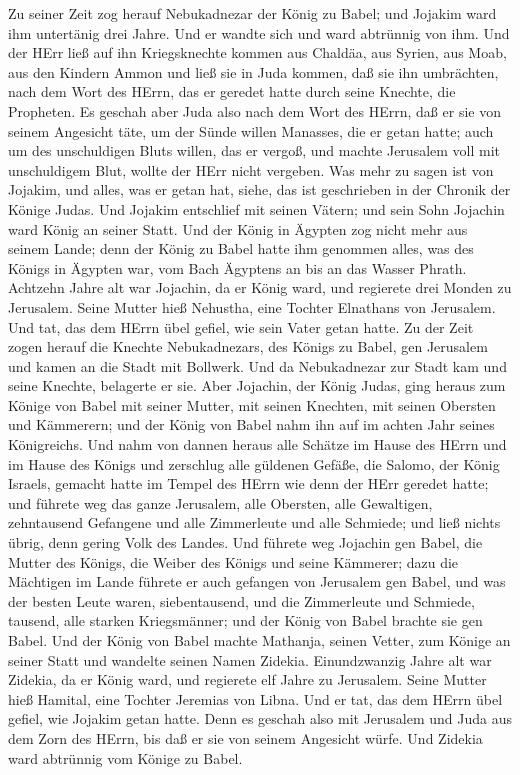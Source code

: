  Zu seiner Zeit zog herauf Nebukadnezar der König zu Babel;
und Jojakim ward ihm untertänig drei Jahre. Und er wandte sich und ward
abtrünnig von ihm.  Und der HErr ließ auf ihn Kriegsknechte
kommen aus Chaldäa, aus Syrien, aus Moab, aus den Kindern Ammon und ließ
sie in Juda kommen, daß sie ihn umbrächten, nach dem Wort des HErrn, das
er geredet hatte durch seine Knechte, die Propheten.  Es
geschah aber Juda also nach dem Wort des HErrn, daß er sie von seinem
Angesicht täte, um der Sünde willen Manasses, die er getan hatte;
 auch um des unschuldigen Bluts willen, das er vergoß, und
machte Jerusalem voll mit unschuldigem Blut, wollte der HErr nicht
vergeben.  Was mehr zu sagen ist von Jojakim, und alles, was
er getan hat, siehe, das ist geschrieben in der Chronik der Könige
Judas.  Und Jojakim entschlief mit seinen Vätern; und sein
Sohn Jojachin ward König an seiner Statt.  Und der König in
Ägypten zog nicht mehr aus seinem Lande; denn der König zu Babel hatte
ihm genommen alles, was des Königs in Ägypten war, vom Bach Ägyptens an
bis an das Wasser Phrath.  Achtzehn Jahre alt war Jojachin,
da er König ward, und regierete drei Monden zu Jerusalem. Seine Mutter
hieß Nehustha, eine Tochter Elnathans von Jerusalem.  Und
tat, das dem HErrn übel gefiel, wie sein Vater getan hatte.
 Zu der Zeit zogen herauf die Knechte Nebukadnezars, des
Königs zu Babel, gen Jerusalem und kamen an die Stadt mit Bollwerk.
 Und da Nebukadnezar zur Stadt kam und seine Knechte,
belagerte er sie.  Aber Jojachin, der König Judas, ging
heraus zum Könige von Babel mit seiner Mutter, mit seinen Knechten, mit
seinen Obersten und Kämmerern; und der König von Babel nahm ihn auf im
achten Jahr seines Königreichs.  Und nahm von dannen heraus
alle Schätze im Hause des HErrn und im Hause des Königs und zerschlug
alle güldenen Gefäße, die Salomo, der König Israels, gemacht hatte im
Tempel des HErrn wie denn der HErr geredet hatte;  und
führete weg das ganze Jerusalem, alle Obersten, alle Gewaltigen,
zehntausend Gefangene und alle Zimmerleute und alle Schmiede; und ließ
nichts übrig, denn gering Volk des Landes.  Und führete weg
Jojachin gen Babel, die Mutter des Königs, die Weiber des Königs und
seine Kämmerer; dazu die Mächtigen im Lande führete er auch gefangen von
Jerusalem gen Babel,  und was der besten Leute waren,
siebentausend, und die Zimmerleute und Schmiede, tausend, alle starken
Kriegsmänner; und der König von Babel brachte sie gen Babel.
 Und der König von Babel machte Mathanja, seinen Vetter,
zum Könige an seiner Statt und wandelte seinen Namen Zidekia.
 Einundzwanzig Jahre alt war Zidekia, da er König ward, und
regierete elf Jahre zu Jerusalem. Seine Mutter hieß Hamital, eine
Tochter Jeremias von Libna.  Und er tat, das dem HErrn übel
gefiel, wie Jojakim getan hatte.  Denn es geschah also mit
Jerusalem und Juda aus dem Zorn des HErrn, bis daß er sie von seinem
Angesicht würfe. Und Zidekia ward abtrünnig vom Könige zu Babel.


